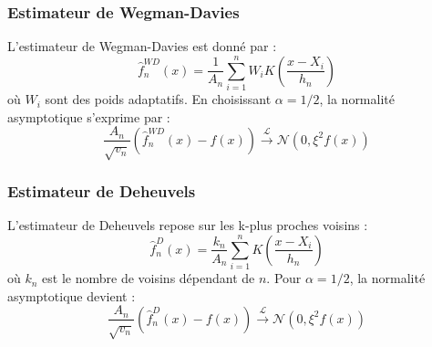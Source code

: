 \documentclass[12pt]{article}
\begin{document}
\subsubsection*{Estimateur de Wegman-Davies}

L'estimateur de Wegman-Davies est donné par :
\[
\hat{f}_n^{WD}(x) = \frac{1}{A_n} \sum_{i=1}^{n} W_i K\left(\frac{x - X_i}{h_n}\right)
\]
où \( W_i \) sont des poids adaptatifs.  
En choisissant \(\alpha = 1/2\), la normalité asymptotique s'exprime par :
\[
\frac{A_n}{\sqrt{v_n}} \left( \hat{f}_n^{WD}(x) - f(x) \right) \xrightarrow{\mathcal{L}} \mathcal{N}(0, \xi^2 f(x))
\]

\subsubsection*{Estimateur de Deheuvels}

L'estimateur de Deheuvels repose sur les k-plus proches voisins :
\[
\hat{f}_n^{D}(x) = \frac{k_n}{A_n} \sum_{i=1}^{n} K\left(\frac{x - X_i}{h_n}\right)
\]
où \( k_n \) est le nombre de voisins dépendant de \( n \).  
Pour \(\alpha = 1/2\), la normalité asymptotique devient :
\[
\frac{A_n}{\sqrt{v_n}} \left( \hat{f}_n^{D}(x) - f(x) \right) \xrightarrow{\mathcal{L}} \mathcal{N}(0, \xi^2 f(x))
\]






\setcounter{page}{41} %

\end{document}
